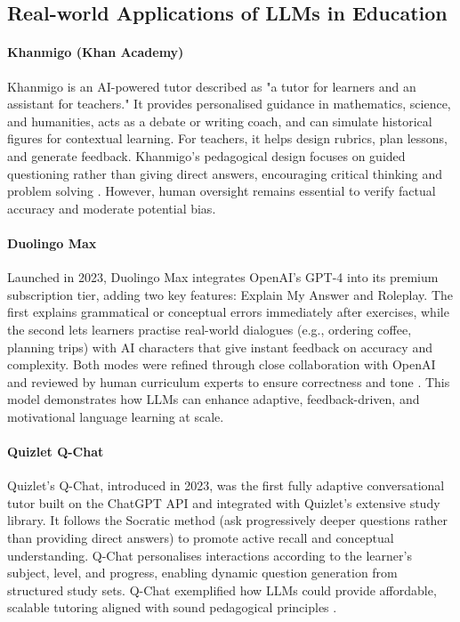 \subsection{Real-world Applications of LLMs in Education}

\paragraph{Khanmigo (Khan Academy)}
Khanmigo is an AI-powered tutor described as "a tutor for learners and an assistant for teachers." It provides personalised guidance in mathematics, science, and humanities, acts as a debate or writing coach, and can simulate historical figures for contextual learning. For teachers, it helps design rubrics, plan lessons, and generate feedback. Khanmigo’s pedagogical design focuses on guided questioning rather than giving direct answers, encouraging critical thinking and problem solving \parencite{Khanmigo61:online}. However, human oversight remains essential to verify factual accuracy and moderate potential bias.

\paragraph{Duolingo Max}
Launched in 2023, Duolingo Max integrates OpenAI’s GPT-4 into its premium subscription tier, adding two key features: Explain My Answer and Roleplay. The first explains grammatical or conceptual errors immediately after exercises, while the second lets learners practise real-world dialogues (e.g., ordering coffee, planning trips) with AI characters that give instant feedback on accuracy and complexity. Both modes were refined through close collaboration with OpenAI and reviewed by human curriculum experts to ensure correctness and tone \parencite{Duolingo46:online}. This model demonstrates how LLMs can enhance adaptive, feedback-driven, and motivational language learning at scale.

\paragraph{Quizlet Q-Chat}
Quizlet’s Q-Chat, introduced in 2023, was the first fully adaptive conversational tutor built on the ChatGPT API and integrated with Quizlet’s extensive study library. It follows the Socratic method (ask progressively deeper questions rather than providing direct answers) to promote active recall and conceptual understanding. Q-Chat personalises interactions according to the learner’s subject, level, and progress, enabling dynamic question generation from structured study sets. Q-Chat exemplified how LLMs could provide affordable, scalable tutoring aligned with sound pedagogical principles \parencite{Introduc91:online}.


